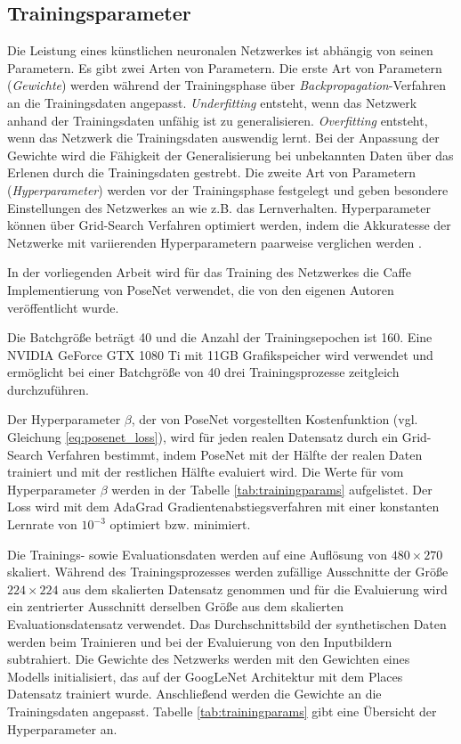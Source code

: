 \subsection{Trainingsparameter}
Die Leistung eines künstlichen neuronalen Netzwerkes ist abhängig von seinen Parametern. Es gibt zwei Arten von Parametern. Die erste Art von Parametern (\textit{Gewichte}) werden während der Trainingsphase über \textit{Backpropagation}-Verfahren an die Trainingsdaten angepasst. \textit{Underfitting} entsteht, wenn das Netzwerk anhand der Trainingsdaten unfähig ist zu generalisieren. \textit{Overfitting} entsteht, wenn das Netzwerk die Trainingsdaten auswendig lernt. Bei der Anpassung der Gewichte wird die Fähigkeit der Generalisierung bei unbekannten Daten über das Erlenen durch die Trainingsdaten gestrebt. Die zweite Art von Parametern (\textit{Hyperparameter}) werden vor der Trainingsphase festgelegt und geben besondere Einstellungen des Netzwerkes an wie z.B. das Lernverhalten. Hyperparameter können über Grid-Search Verfahren optimiert werden, indem die Akkuratesse der Netzwerke mit variierenden Hyperparametern paarweise verglichen werden \cite{Goodfellow-et-al-2016}.


In der vorliegenden Arbeit wird für das Training des Netzwerkes die Caffe \cite{jiaCaffeConvolutionalArchitecture2014} Implementierung von PoseNet verwendet, die von den eigenen Autoren \citet{kendallPoseNetConvolutionalNetwork2015} veröffentlicht wurde.

Die Batchgröße beträgt 40 und die Anzahl der Trainingsepochen ist 160. Eine NVIDIA GeForce GTX 1080 Ti mit 11GB Grafikspeicher wird verwendet und ermöglicht bei einer Batchgröße von 40 drei Trainingsprozesse zeitgleich durchzuführen.

Der Hyperparameter $\beta$, der von PoseNet vorgestellten Kostenfunktion (vgl. Gleichung \ref{eq:posenet_loss}), wird für jeden realen Datensatz durch ein Grid-Search Verfahren bestimmt, indem PoseNet mit der Hälfte der realen Daten trainiert und mit der restlichen Hälfte evaluiert wird. Die Werte für vom Hyperparameter $\beta$ werden in der Tabelle \ref{tab:trainingparams} aufgelistet. Der Loss wird mit dem AdaGrad \cite{duchiAdaptiveSubgradientMethods2011} Gradientenabstiegsverfahren mit einer konstanten Lernrate von $10^{-3}$ optimiert bzw. minimiert. 

Die Trainings- sowie Evaluationsdaten werden auf eine Auflösung von $480\times270$ skaliert. Während des Trainingsprozesses werden zufällige Ausschnitte der Größe $224 \times 224$ aus dem skalierten Datensatz genommen und für die Evaluierung wird ein zentrierter Ausschnitt derselben Größe aus dem skalierten Evaluationsdatensatz verwendet. Das Durchschnittsbild der synthetischen Daten werden beim Trainieren und bei der Evaluierung von den Inputbildern subtrahiert. 
Die Gewichte des Netzwerks werden mit den Gewichten eines Modells initialisiert, das auf der GoogLeNet Architektur mit dem Places Datensatz \cite{zhouLearningDeepFeatures2014} trainiert wurde. Anschließend werden die Gewichte an die Trainingsdaten angepasst. Tabelle \ref{tab:trainingparams} gibt eine Übersicht der Hyperparameter an.

